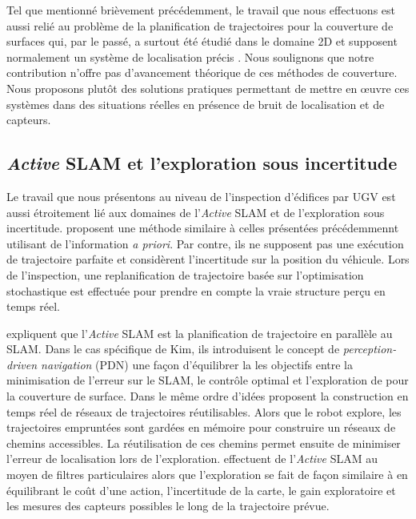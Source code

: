 Tel que mentionné brièvement précédemment, le travail que nous effectuons est aussi relié au problème de la planification de trajectoires pour la couverture de surfaces qui, par le passé, a surtout été étudié dans le domaine 2D et supposent normalement un système de localisation précis \citep{Hert1996, acar2002morse, Acar2002, lim2014crack}. Nous soulignons que notre contribution n'offre pas d'avancement théorique de ces méthodes de couverture. Nous proposons plutôt des solutions pratiques permettant de mettre en \oe uvre ces systèmes dans des situations réelles en présence de bruit de localisation et de capteurs.

\subsection{\textit{Active} SLAM et l'exploration sous incertitude}\label{subsec:active_slam}

Le travail que nous présentons au niveau de l'inspection d'édifices par UGV est aussi étroitement lié aux domaines de l'\textit{Active} SLAM et de l'exploration sous incertitude. \cite{Galceran2014} proposent une méthode similaire à celles présentées précédemmennt utilisant de l'information \textit{a priori}. Par contre, ils ne supposent pas une exécution de trajectoire parfaite et considèrent l'incertitude sur la position du véhicule. Lors de l'inspection, une replanification de trajectoire basée sur l'optimisation stochastique est effectuée pour prendre en compte la vraie structure perçu en temps réel.

\cite{Kim2015} expliquent que l'\textit{Active} SLAM est la planification de trajectoire en parallèle au SLAM. Dans le cas spécifique de Kim, ils introduisent le concept de \textit{perception-driven navigation} (PDN) une façon d'équilibrer la les objectifs entre la minimisation de l'erreur sur le SLAM, le contrôle optimal et l'exploration de pour la couverture de surface. Dans le même ordre d'idées \cite{Stenning2013} proposent la construction en temps réel de réseaux de trajectoires réutilisables. Alors que le robot explore, les trajectoires empruntées sont gardées en mémoire pour construire un réseaux de chemins accessibles. La réutilisation de ces chemins permet ensuite de minimiser l'erreur de localisation lors de l'exploration. \cite{Stachniss2005} effectuent de l'\textit{Active} SLAM au moyen de filtres particulaires alors que l'exploration se fait de façon similaire à \cite{Kim2015} en équilibrant le coût d'une action, l'incertitude de la carte, le gain exploratoire et les mesures des capteurs possibles le long de la trajectoire prévue.

